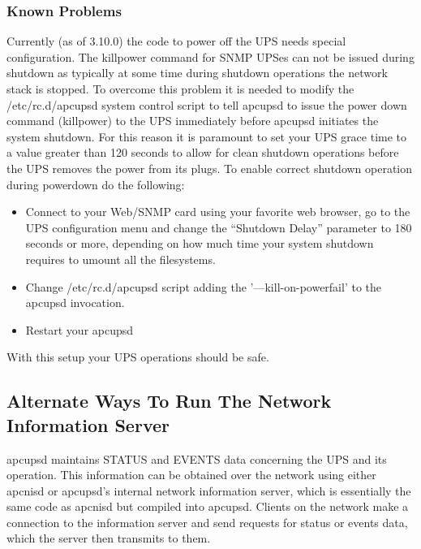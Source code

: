 {{{{{{{{{{\label{Known-Problems}

\subsubsection*{Known Problems}

Currently (as of 3.10.0) the code to power off the UPS needs special
configuration. The killpower command for SNMP UPSes can not be issued during
shutdown as typically at some time during shutdown operations the network
stack is stopped. To overcome this problem it is needed to modify the
/etc/rc.d/apcupsd system control script to tell apcupsd to issue the power
down command (killpower) to the UPS immediately before apcupsd initiates the
system shutdown. For this reason it is paramount to set your UPS grace time to
a value greater than 120 seconds to allow for clean shutdown operations before
the UPS removes the power from its plugs. To enable correct shutdown operation
during powerdown do the following:  

\begin{itemize}
\item Connect to your Web/SNMP card using your favorite web browser, go to the
UPS configuration menu and change the ``Shutdown Delay'' parameter to 180
seconds or more, depending on how much time your system shutdown requires to
umount all the filesystems.  
\item Change /etc/rc.d/apcupsd script adding the '{---}kill-on-powerfail' to
the apcupsd invocation.  
\item Restart your apcupsd 
\end{itemize}

With this setup your UPS operations should be safe. 

\label{Alternate-Ways-To-Run-The-Network-Information-Server}

\subsection*{Alternate Ways To Run The Network Information Server}

\label{index-NIS-alternate-was-of-running-165}
apcupsd maintains STATUS and EVENTS data concerning the UPS and its operation.
This information can be obtained over the network using either apcnisd or
apcupsd's internal network information server, which is essentially the same
code as apcnisd but compiled into apcupsd. Clients on the network make a
connection to the information server and send requests for status or events
data, which the server then transmits to them.  

}}}}}}}}}}
